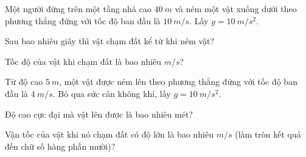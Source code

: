 \begin{vidu}%
Một người đứng trên một tầng nhà cao $40\ m$ và ném một vật xuống dưới theo phương thẳng đứng với tốc độ ban đầu là $10\ m/s$. Lấy $g = 10\ m/s^2$. 
\begin{vdc}
Sau bao nhiêu giây thì vật chạm đất kể từ khi ném vật?
\end{vdc}

\begin{vdc}
Tốc độ của vật khi chạm đất là bao nhiêu $m/s$?
\end{vdc}



\end{vidu}
\begin{vidu}%
Từ độ cao $5\ m$, một vật được ném lên theo phương thẳng đứng với tốc độ ban đầu là $4\ m/s$. Bỏ qua sức cản không khí, lấy $g = 10\ m/s^2$.
\begin{vdc}
Độ cao cực đại mà vật lên được là bao nhiêu mét?
\end{vdc}

\begin{vdc}
Vận tốc của vật khi nó chạm đất có độ lớn là bao nhiêu $m/s$ (làm tròn kết quả đến chữ số hàng phần mười)?
\end{vdc}
\end{vidu}

